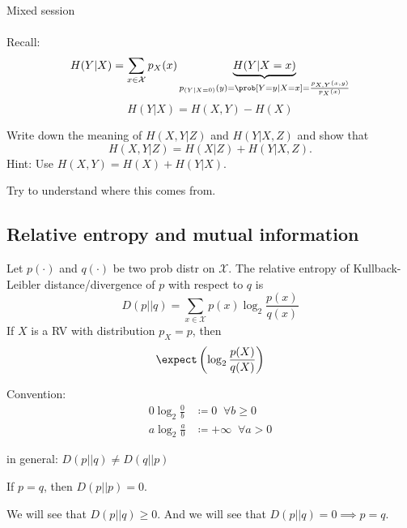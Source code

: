 \documentclass[mfit.tex]{subfiles}
\begin{document}
\clearpage{}
Mixed session\\
\\
Recall: 
\[ H(Y|X) = \sum_{x \in \mathcal{X}} p_X(x) \underbrace{H(Y|X=x)}_{p_{(Y|X=0)}(y) = \prob[Y=y|X=x] = \frac{p_{X,Y}(x,y)}{p_X(x)}} \]
\[ H(Y|X) = H(X,Y) - H(X) \]

\begin{rem}[Exercise]
  Write down the meaning of $H(X,Y|Z)$ and $H(Y|X,Z)$ and show that
  \[ H(X,Y|Z) = H(X|Z) + H(Y|X,Z) \text{.} \]
  Hint: Use $H(X,Y) = H(X) + H(Y|X)$.
  
  Try to understand where this comes from.
\end{rem}

\subsection{Relative entropy and mutual information}

\begin{defi*}
  Let $p(\cdot)$ and $q(\cdot)$ be two prob distr on $\mathcal{X}$.
  The relative entropy of Kullback-Leibler distance/divergence of $p$ with respect to $q$ is 
  \[ D(p||q) = \sum_{x \in \mathcal{X}} p(x) \log_2 \frac{p(x)}{q(x)} \]
  If $X$ is a RV with distribution $p_X = p$, then
  \[ \expect \left( \log_2 \frac{p(X)}{q(X)} \right) \]
\end{defi*}

Convention:
\begin{align*}
  0 \log_2 \frac{0}{b} &\coloneqq 0 \;\; \forall b \geq 0 \\
  a \log_2 \frac{a}{0} &\coloneqq + \infty \;\; \forall a > 0
\end{align*}

in general: $D(p||q) \neq D(q||p)$

If $p=q$, then $D(p||p) = 0$.

We will see that $D(p||q) \geq 0$.
And we will see that $D(p||q) = 0 \implies p=q$.
\end{document}

